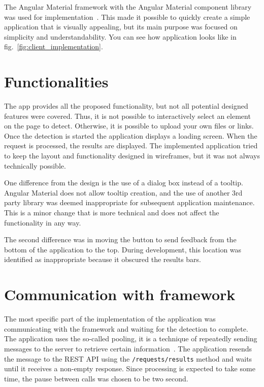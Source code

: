 The Angular Material framework with the Angular Material component library was used for implementation~\cite{AngularMaterial}. This made it possible to quickly create a simple application that is visually appealing, but its main purpose was focused on simplicity and understandability. You can see how application looks like in fig.~\ref{fig:client_implementation}.

\section{Functionalities}

The app provides all the proposed functionality, but not all potential designed features were covered. Thus, it is not possible to interactively select an element on the page to detect. Otherwise, it is possible to upload your own files or links. Once the detection is started the application displays a loading screen. When the request is processed, the results are displayed. The implemented application tried to keep the layout and functionality designed in wireframes, but it was not always technically possible. 

One difference from the design is the use of a dialog box instead of a tooltip. Angular Material does not allow tooltip creation, and the use of another 3rd party library was deemed inappropriate for subsequent application maintenance. This is a minor change that is more technical and does not affect the functionality in any way.

The second difference was in moving the button to send feedback from the bottom of the application to the top. During development, this location was identified as inappropriate because it obscured the results bars.

\section{Communication with framework}

The most specific part of the implementation of the application was communicating with the framework and waiting for the detection to complete. The application uses the so-called pooling, it is a technique of repeatedly sending messages to the server to retrieve certain information~\cite{Pooling}. The application resends the message to the REST API using the \texttt{/requests/results} method and waits until it receives a non-empty response. Since processing is expected to take some time, the pause between calls was chosen to be two second. 


